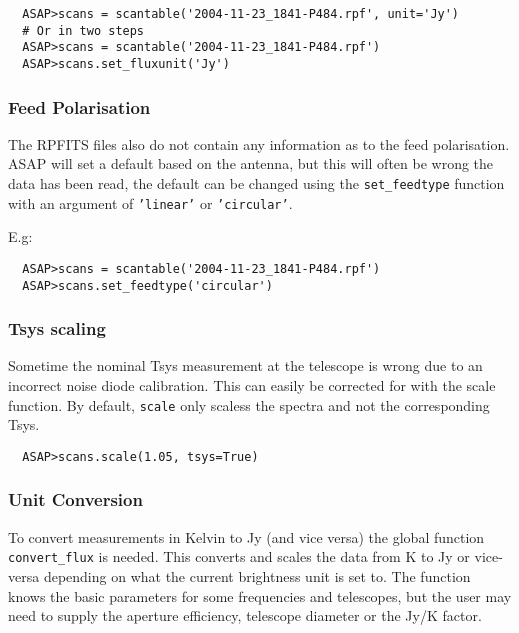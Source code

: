 \documentclass[11pt]{article}
\newcommand{\cmd}[1]{{\tt #1}}
\begin{document}
\begin{verbatim}
  ASAP>scans = scantable('2004-11-23_1841-P484.rpf', unit='Jy')
  # Or in two steps
  ASAP>scans = scantable('2004-11-23_1841-P484.rpf')
  ASAP>scans.set_fluxunit('Jy')
\end{verbatim}

\subsubsection{Feed Polarisation}

The RPFITS files also do not contain any
information as to the feed polarisation. ASAP will set a default based
on the antenna, but this will often be wrong the data has been read,
the default can be changed using the \cmd{set\_feedtype} function with
an argument of \cmd{'linear'} or \cmd{'circular'}.

E.g:

\begin{verbatim}
  ASAP>scans = scantable('2004-11-23_1841-P484.rpf')
  ASAP>scans.set_feedtype('circular')
\end{verbatim}

\subsubsection{Tsys scaling}

Sometime the nominal Tsys measurement at the
telescope is wrong due to an incorrect noise diode calibration. This
can easily be corrected for with the scale function. By default,
\cmd{scale} only scaless the spectra and not the corresponding Tsys.

\begin{verbatim}
  ASAP>scans.scale(1.05, tsys=True)
\end{verbatim}

\subsubsection{Unit Conversion}

To convert measurements in Kelvin to Jy (and
vice versa) the global function \cmd{convert\_flux} is needed. This
converts and scales the data from K to Jy or vice-versa depending on
what the current brightness unit is set to. The function knows the
basic parameters for some frequencies and telescopes, but the user may
need to supply the aperture efficiency, telescope diameter or the Jy/K
factor.
\end{document}

